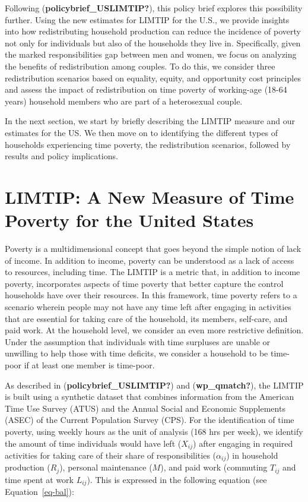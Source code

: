 \documentclass[
  11pt,
]{article}
\begin{document}
Following (\textbf{policybrief\_USLIMTIP?}), this policy brief explores
this possibility further. Using the new estimates for LIMTIP for the
U.S., we provide insights into how redistributing household production
can reduce the incidence of poverty not only for individuals but also of
the households they live in. Specifically, given the marked
responsibilities gap between men and women, we focus on analyzing the
benefits of redistribution among couples. To do this, we consider three
redistribution scenarios based on equality, equity, and opportunity cost
principles and assess the impact of redistribution on time poverty of
working-age (18-64 years) household members who are part of a
heterosexual couple.

In the next section, we start by briefly describing the LIMTIP measure
and our estimates for the US. We then move on to identifying the
different types of households experiencing time poverty, the
redistribution scenarios, followed by results and policy implications.

\section{LIMTIP: A New Measure of Time Poverty for the United
States}\label{limtip-a-new-measure-of-time-poverty-for-the-united-states}

Poverty is a multidimensional concept that goes beyond the simple notion
of lack of income. In addition to income, poverty can be understood as a
lack of access to resources, including time. The LIMTIP is a metric
that, in addition to income poverty, incorporates aspects of time
poverty that better capture the control households have over their
resources. In this framework, time poverty refers to a scenario wherein
people may not have any time left after engaging in activities that are
essential for taking care of the household, its members, self-care, and
paid work. At the household level, we consider an even more restrictive
definition. Under the assumption that individuals with time surpluses
are unable or unwilling to help those with time deficits, we consider a
household to be time-poor if at least one member is time-poor.

As described in (\textbf{policybrief\_USLIMTIP?}) and
(\textbf{wp\_qmatch?}), the LIMTIP is built using a synthetic dataset
that combines information from the American Time Use Survey (ATUS) and
the Annual Social and Economic Supplements (ASEC) of the Current
Population Survey (CPS). For the identification of time poverty, using
weekly hours as the unit of analysis (168 hrs per week), we identify the
amount of time individuals would have left (\(X_{ij}\)) after engaging
in required activities for taking care of their share of
responsibilities (\(\alpha_{ij}\)) in household production (\(R_j\)),
personal maintenance (\(M\)), and paid work (commuting \(T_{ij}\) and
time spent at work \(L_{ij}\)). This is expressed in the following
equation (see Equation~\ref{eq-bal}):
\end{document}

